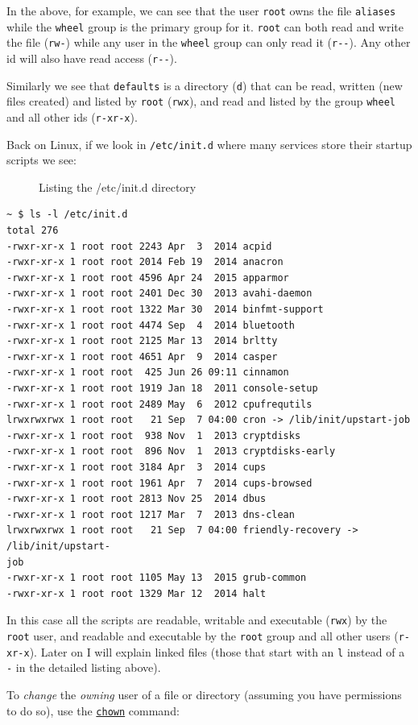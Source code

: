\documentclass[10pt,]{book}
\numberwithin{figure}{chapter}
\DeclareRobustCommand{\drcap}[1]{\begin{figure}[H]\caption{#1}\end{figure}}
\DeclareRobustCommand{\drcmd}[1]{\index{Commands!#1}}
\begin{document}
In the above, for example, we can see that the user \texttt{root} owns
the file \texttt{aliases} while the \texttt{wheel} group is the primary
group for it. \texttt{root} can both read and write the file
(\texttt{rw-}) while any user in the \texttt{wheel} group can only read
it (\texttt{r-{}-}). Any other id will also have read access
(\texttt{r-{}-}).

Similarly we see that \texttt{defaults} is a directory (\texttt{d}) that
can be read, written (new files created) and listed by \texttt{root}
(\texttt{rwx}), and read and listed by the group \texttt{wheel} and all
other ids (\texttt{r-xr-x}).

Back on Linux, if we look in \texttt{/etc/init.d} where many services
store their startup scripts we see:

\drcap{Listing the /etc/init.d directory}

\begin{verbatim}
~ $ ls -l /etc/init.d
total 276
-rwxr-xr-x 1 root root 2243 Apr  3  2014 acpid
-rwxr-xr-x 1 root root 2014 Feb 19  2014 anacron
-rwxr-xr-x 1 root root 4596 Apr 24  2015 apparmor
-rwxr-xr-x 1 root root 2401 Dec 30  2013 avahi-daemon
-rwxr-xr-x 1 root root 1322 Mar 30  2014 binfmt-support
-rwxr-xr-x 1 root root 4474 Sep  4  2014 bluetooth
-rwxr-xr-x 1 root root 2125 Mar 13  2014 brltty
-rwxr-xr-x 1 root root 4651 Apr  9  2014 casper
-rwxr-xr-x 1 root root  425 Jun 26 09:11 cinnamon
-rwxr-xr-x 1 root root 1919 Jan 18  2011 console-setup
-rwxr-xr-x 1 root root 2489 May  6  2012 cpufrequtils
lrwxrwxrwx 1 root root   21 Sep  7 04:00 cron -> /lib/init/upstart-job
-rwxr-xr-x 1 root root  938 Nov  1  2013 cryptdisks
-rwxr-xr-x 1 root root  896 Nov  1  2013 cryptdisks-early
-rwxr-xr-x 1 root root 3184 Apr  3  2014 cups
-rwxr-xr-x 1 root root 1961 Apr  7  2014 cups-browsed
-rwxr-xr-x 1 root root 2813 Nov 25  2014 dbus
-rwxr-xr-x 1 root root 1217 Mar  7  2013 dns-clean
lrwxrwxrwx 1 root root   21 Sep  7 04:00 friendly-recovery -> /lib/init/upstart-
job
-rwxr-xr-x 1 root root 1105 May 13  2015 grub-common
-rwxr-xr-x 1 root root 1329 Mar 12  2014 halt
\end{verbatim}

In this case all the scripts are readable, writable and executable
(\texttt{rwx}) by the \texttt{root} user, and readable and executable by
the \texttt{root} group and all other users (\texttt{r-xr-x}). Later on
I will explain linked files (those that start with an \texttt{l} instead
of a \texttt{-} in the detailed listing above).

To \emph{change} the \emph{owning} user of a file or directory (assuming
you have permissions to do so), use the
\href{http://linux.die.net/man/1/chown}{\texttt{chown}}\drcmd{chown}
command:
\end{document}
